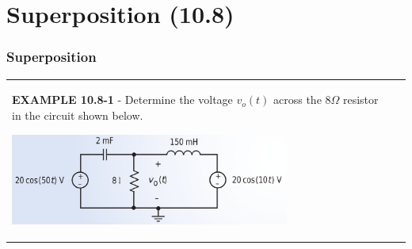 \documentclass[aspectratio=169]{beamer}
\begin{document}
\section{Superposition (10.8)}
\begin{frame}[fragile]
	\frametitle{Superposition}
\begin{tabular}{ll}
	\begin{columns}
		\begin{column}{1\textwidth}  %
		\textbf{EXAMPLE 10.8-1} - Determine the voltage $v_o(t)$ across the $8 \Omega$ resistor in the circuit shown below.

		\begin{center}
    			\includegraphics[height=3cm]{figure37.png}	
		\end{center}	
		\scalebox{0.6}{Answer: $v_o(t)=v_{o1}(t)+v_{o2}(t)=15.46 \cos(50t+104.0^o)+20.24 \cos(10t-10.94^o)$}
		\end{column}
	\end{columns}
\end{tabular}	
\end{frame}
\end{document}
